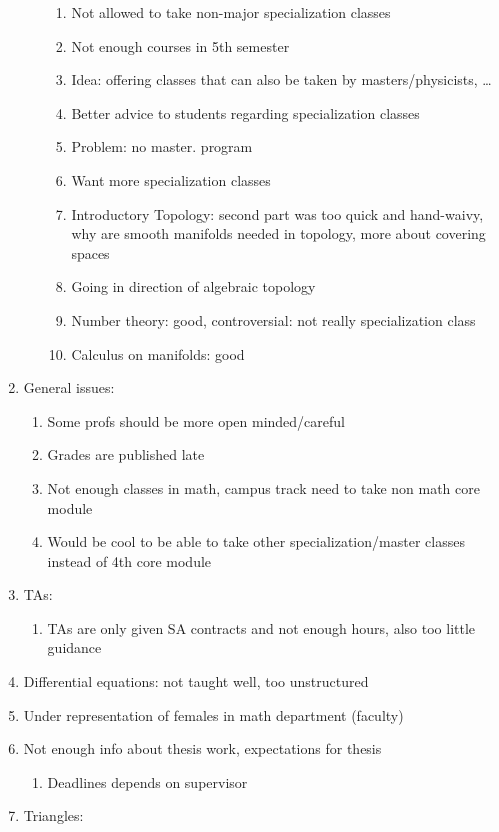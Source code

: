 \begin{enumerate}
\begin{enumerate}
\begin{enumerate}
\item Not allowed to take non-major specialization classes
\item Not enough courses in 5th semester
\item Idea: offering classes that can also be taken by masters/physicists, \ldots{}
\item Better advice to students regarding specialization classes
\item Problem: no master. program
\item Want more specialization classes
\item Introductory Topology: second part was too quick and hand-waivy, why are smooth manifolds needed in topology, more about covering spaces
\item Going in direction of algebraic topology
\item Number theory: good, controversial: not really specialization class
\item Calculus on manifolds: good
\end{enumerate}
\end{enumerate}
\item General issues:
\begin{enumerate}
\item Some profs should be more open minded/careful
\item Grades are published late
\item Not enough classes in math, campus track need to take non math core module
\item Would be cool to be able to take other specialization/master classes instead of 4th core module
\end{enumerate}
\item TAs:
\begin{enumerate}
\item TAs are only given SA contracts and not enough hours, also too little guidance
\end{enumerate}
\item Differential equations: not taught well, too unstructured
\item Under representation of females in math department (faculty)
\item Not enough info about thesis work, expectations for thesis
\begin{enumerate}
\item Deadlines depends on supervisor
\end{enumerate}
\item Triangles:

\end{enumerate}
